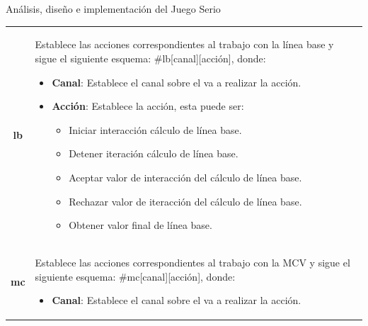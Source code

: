 \begin{thesischapter}{2} {Análisis, diseño e implementación del Juego Serio}
\begin{table}[h]
\begin{tabular}{ |c|p{14cm}|}
\begin{minipage}{14cm}
                            \end{minipage}\\\hline
        \textbf{lb}     &   \begin{minipage}{14cm}
                                \vspace{1pt}
                                Establece las acciones correspondientes al trabajo con la línea base y sigue el siguiente esquema: \#lb[canal][acción], donde:
                                \begin{itemize}
                                    \item \textbf{Canal}: Establece el canal sobre el va a realizar la acción.
                                    \item \textbf{Acción}: Establece la acción, esta puede ser: 
                                    \begin{itemize}
                                        \item Iniciar interacción cálculo de línea base.
                                        \item Detener iteración cálculo de línea base.
                                        \item Aceptar valor de interacción del cálculo de línea base.
                                        \item Rechazar valor de iteracción del cálculo de línea base.
                                        \item Obtener valor final de línea base.
                                    \end{itemize}
                                \end{itemize} 
                                \vspace{1pt}
                            \end{minipage}\\\hline
        \textbf{mc}     &   \begin{minipage}{14cm}
                                \vspace{1pt}
                                Establece las acciones correspondientes al trabajo con la MCV y sigue el siguiente esquema: \#mc[canal][acción], donde:
                                \begin{itemize}
                                    \item \textbf{Canal}: Establece el canal sobre el va a realizar la acción.

\end{itemize}
\end{minipage}
\end{tabular}
\end{table}
\end{thesischapter}
